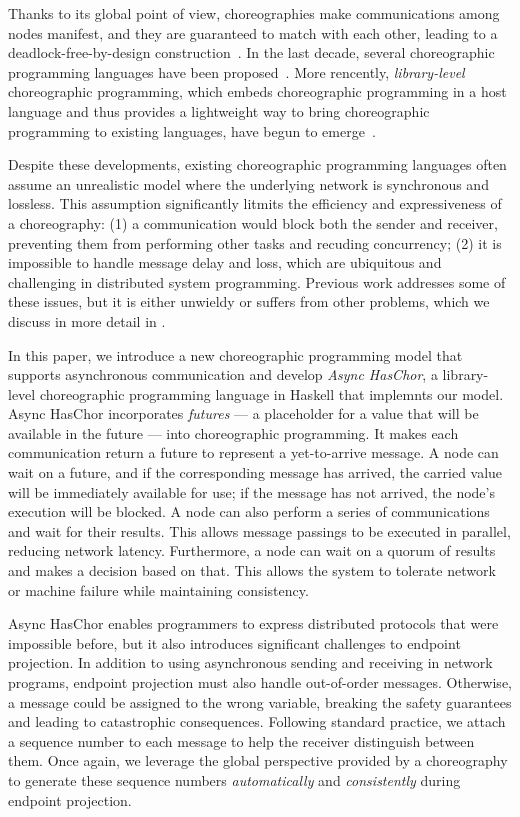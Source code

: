 Thanks to its global point of view, choreographies make communications among nodes manifest, and they are guaranteed to match with each other, leading to a deadlock-free-by-design construction~\citep{deadlock-free-by-design}.
%
In the last decade, several choreographic programming languages have been proposed~\citep{aiocj, choral, pirouette, CC, chor-lambda}.
%
More rencently, \emph{library-level} choreographic programming, which embeds choreographic programming in a host language and thus provides a lightweight way to bring choreographic programming to existing languages, have begun to emerge~\citep{haschor, chorus}.

Despite these developments, existing choreographic programming languages often assume an unrealistic model where the underlying network is synchronous and lossless.
%
This assumption significantly litmits the efficiency and expressiveness of a choreography:
%
(1) a communication would block both the sender and receiver, preventing them from performing other tasks and recuding concurrency;
%
(2) it is impossible to handle message delay and loss, which are ubiquitous and challenging in distributed system programming.
%
Previous work addresses some of these issues, but it is either unwieldy or suffers from other problems, which we discuss in more detail in .

In this paper, we introduce a new choreographic programming model that supports asynchronous communication and develop \emph{Async HasChor}, a library-level choreographic programming language in Haskell that implemnts our model.
%
Async HasChor incorporates \emph{futures} --- a placeholder for a value that will be available in the future --- into choreographic programming.
%
It makes each communication return a future to represent a yet-to-arrive message.
%
A node can wait on a future, and if the corresponding message has arrived, the carried value will be immediately available for use;
%
if the message has not arrived, the node's execution will be blocked.
%
A node can also perform a series of communications and wait for their results.
%
This allows message passings to be executed in parallel, reducing network latency.
%
Furthermore, a node can wait on a quorum of results and makes a decision based on that.
%
This allows the system to tolerate network or machine failure while maintaining consistency.

Async HasChor enables programmers to express distributed protocols that were impossible before, but it also introduces significant challenges to endpoint projection.
%
In addition to using asynchronous sending and receiving in network programs, endpoint projection must also handle out-of-order messages.
%
Otherwise, a message could be assigned to the wrong variable, breaking the safety guarantees and leading to catastrophic consequences.
%
Following standard practice, we attach a sequence number to each message to help the receiver distinguish between them.
%
Once again, we leverage the global perspective provided by a choreography to generate these sequence numbers \emph{automatically} and \emph{consistently} during endpoint projection.

